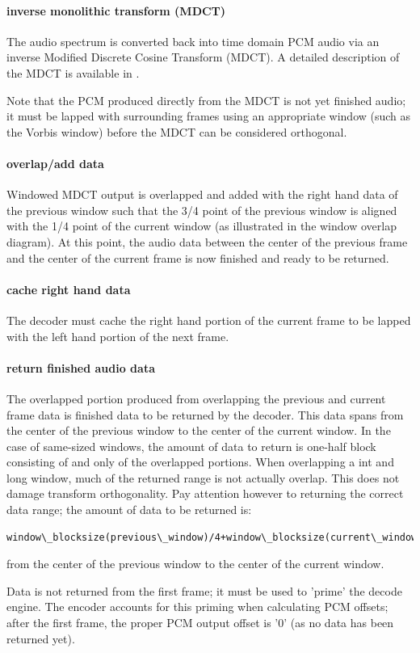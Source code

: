 \paragraph{inverse monolithic transform (MDCT)}

The audio spectrum is converted back into time domain PCM audio via an
inverse Modified Discrete Cosine Transform (MDCT).  A detailed
description of the MDCT is available in \cite{Sporer/Brandenburg/Edler}.

Note that the PCM produced directly from the MDCT is not yet finished
audio; it must be lapped with surrounding frames using an appropriate
window (such as the Vorbis window) before the MDCT can be considered
orthogonal.



\paragraph{overlap/add data}
Windowed MDCT output is overlapped and added with the right hand data
of the previous window such that the 3/4 point of the previous window
is aligned with the 1/4 point of the current window (as illustrated in
the window overlap diagram). At this point, the audio data between the
center of the previous frame and the center of the current frame is
now finished and ready to be returned.


\paragraph{cache right hand data}
The decoder must cache the right hand portion of the current frame to
be lapped with the left hand portion of the next frame.



\paragraph{return finished audio data}

The overlapped portion produced from overlapping the previous and
current frame data is finished data to be returned by the decoder.
This data spans from the center of the previous window to the center
of the current window.  In the case of same-sized windows, the amount
of data to return is one-half block consisting of and only of the
overlapped portions. When overlapping a int and long window, much of
the returned range is not actually overlap.  This does not damage
transform orthogonality.  Pay attention however to returning the
correct data range; the amount of data to be returned is:

\begin{Verbatim}[commandchars=\\\{\}]
window\_blocksize(previous\_window)/4+window\_blocksize(current\_window)/4
\end{Verbatim}

from the center of the previous window to the center of the current
window.

Data is not returned from the first frame; it must be used to 'prime'
the decode engine.  The encoder accounts for this priming when
calculating PCM offsets; after the first frame, the proper PCM output
offset is '0' (as no data has been returned yet).
